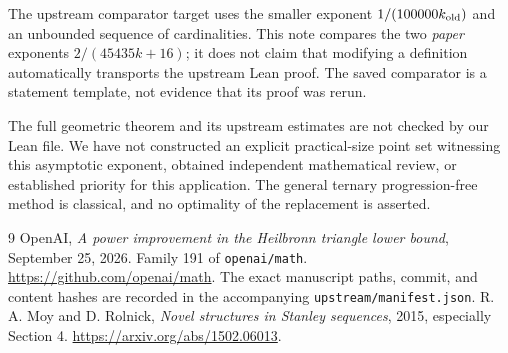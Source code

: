 \documentclass[11pt]{article}
\begin{document}
The upstream comparator target uses the smaller exponent
\(1/(100000k_{\rm old})\) and an unbounded sequence of cardinalities.
This note compares the two \emph{paper} exponents
\(2/(45435k+16)\); it does not claim that modifying a definition
automatically transports the upstream Lean proof. The saved comparator
is a statement template, not evidence that its proof was rerun.

The full geometric theorem and its upstream estimates are not checked
by our Lean file. We have not constructed an explicit practical-size
point set witnessing this asymptotic exponent, obtained independent
mathematical review, or established priority for this application.
The general ternary progression-free method is classical, and no
optimality of the replacement is asserted.

\begin{thebibliography}{9}
OpenAI, \emph{A power improvement in the Heilbronn triangle lower bound},
September 25, 2026. Family 191 of \texttt{openai/math}.
\url{https://github.com/openai/math}.
The exact manuscript paths, commit, and content hashes are recorded
in the accompanying \texttt{upstream/manifest.json}.
R. A. Moy and D. Rolnick, \emph{Novel structures in Stanley sequences},
2015, especially Section 4.
\url{https://arxiv.org/abs/1502.06013}.
\end{thebibliography}
\end{document}
